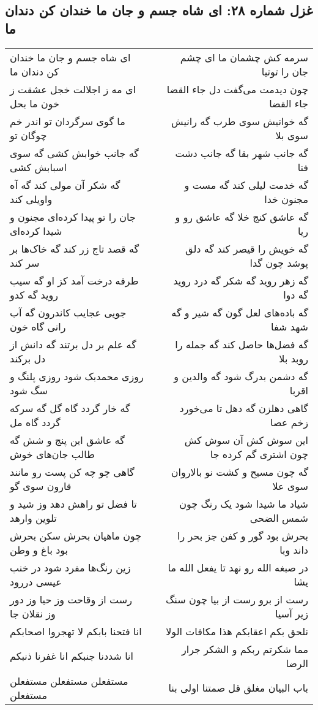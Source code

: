 \begin{center}
\section*{غزل شماره ۲۸: ای شاه جسم و جان ما خندان کن دندان ما}
\label{sec:0028}
\begin{longtable}{l p{0.5cm} r}
ای شاه جسم و جان ما خندان کن دندان ما
&&
سرمه کش چشمان ما ای چشم جان را توتیا
\\
ای مه ز اجلالت خجل عشقت ز خون ما بحل
&&
چون دیدمت می‌گفت دل جاء القضا جاء القضا
\\
ما گوی سرگردان تو اندر خم چوگان تو
&&
گه خوانیش سوی طرب گه رانیش سوی بلا
\\
گه جانب خوابش کشی گه سوی اسبابش کشی
&&
گه جانب شهر بقا گه جانب دشت فنا
\\
گه شکر آن مولی کند گه آه واویلی کند
&&
گه خدمت لیلی کند گه مست و مجنون خدا
\\
جان را تو پیدا کرده‌ای مجنون و شیدا کرده‌ای
&&
گه عاشق کنج خلا گه عاشق رو و ریا
\\
گه قصد تاج زر کند گه خاک‌ها بر سر کند
&&
گه خویش را قیصر کند گه دلق پوشد چون گدا
\\
طرفه درخت آمد کز او گه سیب روید گه کدو
&&
گه زهر روید گه شکر گه درد روید گه دوا
\\
جویی عجایب کاندرون گه آب رانی گاه خون
&&
گه باده‌های لعل گون گه شیر و گه شهد شفا
\\
گه علم بر دل برتند گه دانش از دل برکند
&&
گه فضل‌ها حاصل کند گه جمله را روبد بلا
\\
روزی محمدبک شود روزی پلنگ و سگ شود
&&
گه دشمن بدرگ شود گه والدین و اقربا
\\
گه خار گردد گاه گل گه سرکه گردد گاه مل
&&
گاهی دهلزن گه دهل تا می‌خورد زخم عصا
\\
گه عاشق این پنج و شش گه طالب جان‌های خوش
&&
این سوش کش آن سوش کش چون اشتری گم کرده جا
\\
گاهی چو چه کن پست رو مانند قارون سوی گو
&&
گه چون مسیح و کشت نو بالاروان سوی علا
\\
تا فضل تو راهش دهد وز شید و تلوین وارهد
&&
شیاد ما شیدا شود یک رنگ چون شمس الضحی
\\
چون ماهیان بحرش سکن بحرش بود باغ و وطن
&&
بحرش بود گور و کفن جز بحر را داند وبا
\\
زین رنگ‌ها مفرد شود در خنب عیسی دررود
&&
در صبغه الله رو نهد تا یفعل الله ما یشا
\\
رست از وقاحت وز حیا وز دور وز نقلان جا
&&
رست از برو رست از بیا چون سنگ زیر آسیا
\\
انا فتحنا بابکم لا تهجروا اصحابکم
&&
نلحق بکم اعقابکم هذا مکافات الولا
\\
انا شددنا جنبکم انا غفرنا ذنبکم
&&
مما شکرتم ربکم و الشکر جرار الرضا
\\
مستفعلن مستفعلن مستفعلن مستفعلن
&&
باب البیان مغلق قل صمتنا اولی بنا
\\
\end{longtable}
\end{center}
